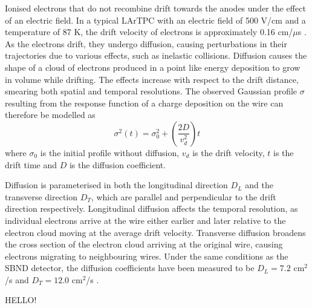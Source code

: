 Ionised electrons that do not recombine drift towards the anodes under the effect of an electric field.
In a typical LArTPC with an electric field of 500 V/cm and a temperature of 87 K, the drift velocity of electrons is approximately 0.16 cm/$\mu$s \cite{drift_vel}.
As the electrons drift, they undergo diffusion, causing perturbations in their trajectories due to various effects, such as inelastic collisions.
Diffusion causes the shape of a cloud of electrons produced in a point like energy deposition to grow in volume while drifting.
The effects increase with respect to the drift distance, smearing both spatial and temporal resolutions.
The observed Gaussian profile $\sigma$ resulting from the response function of a charge deposition on the wire can therefore be modelled as \cite{uboone_diff} 
\begin{equation}
	\sigma^{2} (t) = \sigma^{2}_{0} + \left(\frac{2D}{v^{2}_{d}}\right)t
\end{equation}
where $\sigma_{0}$ is the initial profile without diffusion, $v_{d}$ is the drift velocity, $t$ is the drift time and $D$ is the diffusion coefficient.

Diffusion is parameterised in both the longitudinal direction $D_{L}$ and the transverse direction $D_{T}$, which are parallel and perpendicular to the drift direction respectively.
Longitudinal diffusion affects the temporal resolution, as individual electrons arrive at the wire either earlier and later relative to the electron cloud moving at the average drift velocity.
Transverse diffusion broadens the cross section of the electron cloud arriving at the original wire, causing electrons migrating to neighbouring wires.
Under the same conditions as the SBND detector, the diffusion coefficients have been measured to be $D_{L} = 7.2 $ cm$^{2}$/s and $D_T = 12.0 $ cm$^{2}$/s \cite{drift_vel}.


HELLO!
\cite{GrayDiffusion}


